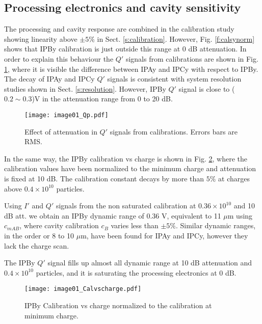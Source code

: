 \subsection{Processing electronics and cavity sensitivity}
The processing and cavity response are combined in the calibration study showing linearity above $\pm5\%$ in Sect. \ref{s:calibration}. However, Fig. \ref{f:calsynorm} shows that IPBy calibration is just outside this range at 0 dB attenuation. In order to explain this behaviour the $Q'$ signals from calibrations are shown in Fig. \ref{f:Qp}, where it is visible the difference between IPAy and IPCy with respect to IPBy. The decay of IPAy and IPCy $Q'$ signals is consistent with system resolution studies shown in Sect. \ref{s:resolution}. However, IPBy $Q'$ signal is close to ($0.2\sim0.3$)V in the attenuation range from 0 to 20 dB.\par%
\begin{figure}[!htb]
\centering
 \texttt{[image: image01\_Qp.pdf]}\caption{Effect of attenuation in $Q'$ signals from calibrations. Errors bars are RMS.}\label{f:Qp}
\end{figure}
In the same way, the IPBy calibration vs charge is shown in Fig. \ref{f:chargescan}, where the calibration values have been normalized to the minimum charge and attenuation is fixed at 10 dB. The calibration constant decays by more than $5\%$ at charges above $0.4\times10^{10}$ particles.\par
Using $I'$ and $Q'$ signals from the non saturated calibration at $0.36\times10^{10}$ and 10 dB att. we obtain an IPBy dynamic range of 0.36 V, equivalent to 11 $\mu$m using $c_{mAB}$, where cavity calibration $c_B$ varies less than $ \pm5\%$.  Similar dynamic ranges, in the order or 8 to 10 $\mu$m, have been found for IPAy and IPCy, however they lack the charge scan.\par
The IPBy $Q'$ signal fills up almost all dynamic range at 10 dB attenuation and $0.4\times10^{10}$ particles, and it is saturating the processing electronics at 0 dB.\par
\begin{figure}[!htb]
\centering%
 \texttt{[image: image01\_Calvscharge.pdf]}\caption{IPBy Calibration vs charge normalized to the calibration at minimum charge.}\label{f:chargescan}
\end{figure}
